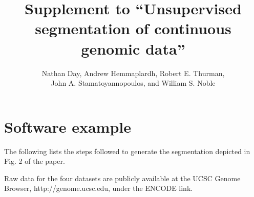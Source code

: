 \documentclass{article}
\begin{document}
\title{Supplement to ``Unsupervised segmentation of continuous genomic
  data''}

\author{Nathan Day, Andrew Hemmaplardh, Robert E. Thurman, \\ John
A. Stamatoyannopoulos, and William S. Noble}

\maketitle

\section{Software example}

The following lists the steps followed to generate the segmentation
depicted in Fig. 2 of the paper.

Raw data for the four datasets are publicly available at the UCSC
Genome Browser, http://genome.ucsc.edu, under the ENCODE link.
\end{document}
